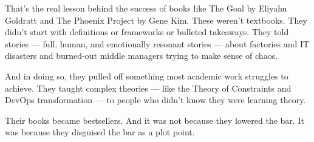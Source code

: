 That’s the real lesson behind the success of books like The Goal by Eliyahu Goldratt and The Phoenix Project by Gene Kim.
These weren’t textbooks. They didn’t start with definitions or frameworks or bulleted takeaways.
They told stories — full, human, and emotionally resonant stories — about factories and IT disasters and burned-out middle managers trying to make sense of chaos.

And in doing so, they pulled off something most academic work struggles to achieve.
They taught complex theories — like the Theory of Constraints and DevOps transformation — to people who didn’t know 
they were learning theory.

Their books became bestsellers. And it was not because they lowered the bar. 
It was because they disguised the bar as a plot point.

\medskip

